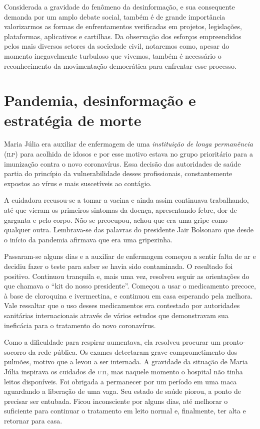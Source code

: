 Considerada a gravidade do fenômeno da desinformação,
e sua consequente demanda por um amplo debate social, também é de grande importância 
valorizarmos as formas de enfrentamentos verificadas em projetos, legislações,
plataformas, aplicativos e cartilhas. Da observação dos esforços
empreendidos pelos mais diversos setores da sociedade civil, notaremos
como, apesar do momento inegavelmente turbuloso que vivemos, também é
necessário o reconhecimento da movimentação democrática para enfrentar esse
processo.


\chapter{Pandemia, desinformação e\\estratégia de morte}

Maria Júlia era auxiliar de enfermagem de uma \textit{instituição de longa
permanência} (\textsc{ilp}) para acolhida de idosos e por esse motivo estava no
grupo prioritário para a imunização contra o novo coronavírus. Essa
decisão das autoridades de saúde partia do princípio da vulnerabilidade
desses profissionais, constantemente expostos ao vírus e mais
suscetíveis ao contágio.

A cuidadora recusou-se a tomar a vacina e ainda assim continuava
trabalhando, até que vieram os primeiros sintomas da doença,
apresentando febre, dor de garganta e pelo corpo. Não se preocupou,
achou que era uma gripe como qualquer outra. Lembrava-se das palavras do
presidente Jair Bolsonaro que desde o início da pandemia afirmava que
era uma gripezinha.

Passaram-se alguns dias e a auxiliar de enfermagem começou a sentir
falta de ar e decidiu fazer o teste para saber se havia sido
contaminada. O resultado foi positivo. Continuou tranquila e, mais uma
vez, resolveu seguir as orientações do que chamava o ``kit do nosso
presidente''. Começou a usar o medicamento precoce, à base de cloroquina
e ivermectina, e continuou em casa esperando pela melhora. Vale
ressaltar que o uso desses medicamentos era contestado por autoridades
sanitárias internacionais através de vários estudos que demonstravam sua
ineficácia para o tratamento do novo coronavírus.

Como a dificuldade para respirar aumentava, ela resolveu procurar um
pronto-socorro da rede pública. Os exames detectaram grave
comprometimento dos pulmões, motivo que a levou a ser internada. A
gravidade da situação de Maria Júlia inspirava os cuidados de \textsc{uti}, mas naquele momento o hospital não tinha leitos
disponíveis. Foi obrigada a permanecer por um período em uma maca
aguardando a liberação de uma vaga. Seu estado de saúde piorou, a ponto
de precisar ser entubada. Ficou inconsciente por alguns dias, até
melhorar o suficiente para continuar o tratamento em leito normal e,
finalmente, ter alta e retornar para casa.


